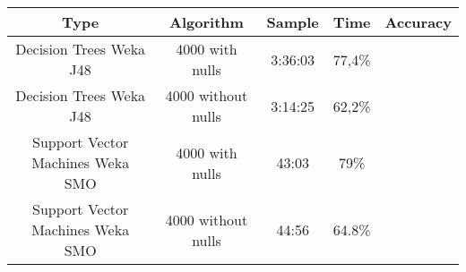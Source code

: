 \begin{tabular}{|c|c|c|c|c|}
\hline
Type     &       Algorithm   & Sample &  Time &  Accuracy   \\
\hline
\hline
Decision Trees   Weka J48    & 4000  with nulls &   3:36:03 &    77,4\%  \\
Decision Trees   Weka J48    & 4000  without nulls &  3:14:25  &    62,2\%  \\
Support Vector Machines   Weka SMO    & 4000  with nulls &   43:03 &    79\%  \\
Support Vector Machines   Weka SMO    & 4000  without nulls &  44:56 &    64.8\%  \\
\hline
\end{tabular}
%
%
%
%
%
